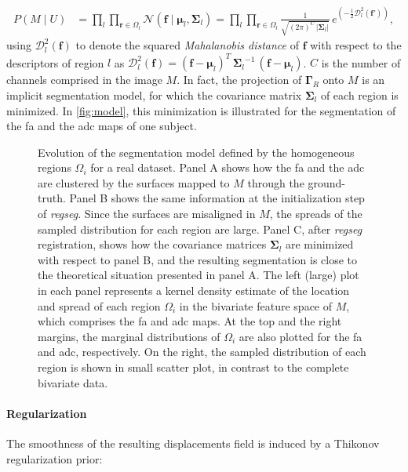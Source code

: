 \documentclass[3p,authoryear,fleqn]{elsarticle}
\providecommand{\mdist}[2]{ \mathcal{D}_{#2}^2(\mathbf{#1}) }
\providecommand{\gammaset}{\ensuremath{\boldsymbol{\Gamma}}}
\providecommand{\regseg}{\emph{regseg}}
\renewcommand{\vec}[1]{\mathbf{#1}}
\begin{document}
  \begin{align}
  P( M \mid U) &= \underset{l}{\prod} \underset{\vec{r} \in \Omega_l}{\prod}
  \mathcal{N} ( \vec{f} \mid \boldsymbol{\mu}_l, \boldsymbol{\Sigma}_{l} ) =   \underset{l}{\prod} \underset{\vec{r} \in \Omega_l}{\prod} \frac{1}{ \sqrt{(2\pi)^{C}\,\left|\boldsymbol{\Sigma}_{l}\right|}}\,{e^{\left(-\frac{1}{2}
  \mdist{f'}{l} \right)}},
  \label{eq:pdf}
  \end{align}
  using $\mdist{f}{l}$ to denote the squared \emph{Mahalanobis distance} of $\vec{f}$ with respect
  to the descriptors of region $l$ as
  $\mdist{f}{l} = (\vec{f} - \boldsymbol{\mu}_l)^T \, {\boldsymbol{\Sigma}_l}^{-1} \, (\vec{f} - \boldsymbol{\mu}_l)$.
$C$ is the number of channels comprised in the image $M$.
In fact, the projection of $\gammaset_R$ onto $M$ is an implicit segmentation model, for which
  the covariance matrix $\boldsymbol{\Sigma}_l$ of each region is minimized. In \autoref{fig:model},
  this minimization is illustrated for the segmentation of the \gls*{fa} and the \gls*{adc} maps
  of one subject.

\begin{figure}
\caption{Evolution of the segmentation model defined by the homogeneous regions $\Omega_i$
  for a real dataset.
Panel A shows how the \gls*{fa} and the \gls*{adc} are clustered by the surfaces mapped to
  $M$ through the ground-truth.
Panel B shows the same information at the initialization step of \regseg{}.
Since the surfaces are misaligned in $M$, the spreads of the sampled distribution for
  each region are large.
Panel C, after \regseg{} registration, shows how the covariance matrices $\boldsymbol{\Sigma}_l$ 
  are minimized with respect to panel B, and the resulting segmentation is close
  to the theoretical situation presented in panel A.
The left (large) plot in each panel represents a kernel density estimate of the location and spread of
  each region $\Omega_i$ in the bivariate feature space of $M$, which comprises
  the \gls*{fa} and \gls*{adc} maps.
At the top and the right margins, the marginal distributions of $\Omega_i$ are also plotted for
  the \gls*{fa} and \gls*{adc}, respectively.
On the right, the sampled distribution of each region is shown in small scatter plot, in contrast to
  the complete bivariate data.
}\label{fig:model}
\end{figure}

\paragraph*{Regularization}
The smoothness of the resulting displacements field is induced by a Thikonov regularization
  prior:
\end{document}
